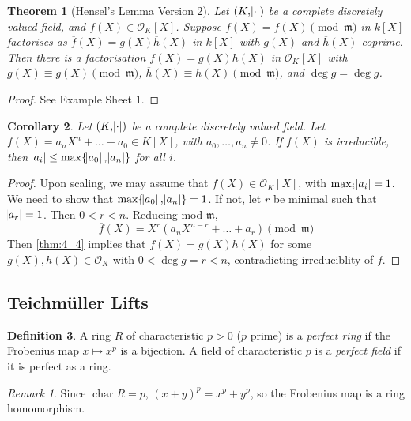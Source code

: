 \documentclass[11pt]{article}
\theoremstyle{definition}
\newtheorem{definition}{Definition}[subsection]
\theoremstyle{plain}
\newtheorem{theorem}[definition]{Theorem}
\newtheorem{corollary}[definition]{Corollary}
\theoremstyle{remark}
\newtheorem*{remark}{Remark}
\DeclareMathOperator{\Char}{char}
\newcommand{\cO}{\mathcal{O}}
\newcommand{\fm}{\mathfrak{m}}
\begin{document}
\begin{theorem}[Hensel's Lemma Version 2]\label{thm:4_4}
    Let $(K, \abs{\cdot})$ be a complete discretely valued field, and $f(X) \in \cO_K[X]$. Suppose $\overline{f}(X) = f(X) \pmod{\fm}$ in $k[X]$ factorises as $\overline{f}(X) = \overline{g}(X) \overline{h}(X)$ in $k[X]$ with $\overline{g}(X)$ and $\overline{h}(X)$ coprime. Then there is a factorisation $f(X) = g(X) h(X)$ in $\cO_K[X]$ with $\overline{g}(X) \equiv g(X) \pmod{\fm}$, $\overline{h}(X) \equiv h(X) \pmod{\fm}$, and $\deg{g} = \deg{\overline{g}}$.
\end{theorem}
\begin{proof}
    See Example Sheet 1.
\end{proof}

\begin{corollary}\label{cor:4_5}
    Let $(K, \abs{\cdot})$ be a complete discretely valued field. Let $f(X) = a_n X^n + \ldots + a_0 \in K[X]$, with $a_0, \ldots, a_n \neq 0$. If $f(X)$ is irreducible, then $\abs{a_i} \le \max\{\abs{a_0}, \abs{a_n}\}$ for all $i$.
\end{corollary}

\begin{proof}
    Upon scaling, we may assume that $f(X) \in \cO_K[X]$, with $\max_i \abs{a_i} = 1$. We need to show that $\max \{\abs{a_0}, \abs{a_n}\} = 1$. If not, let $r$ be minimal such that $\abs{a_r} = 1$. Then $0 < r < n$. Reducing mod $\fm$,
    \begin{equation*}
        \overline{f}(X) = X^r (a_n X^{n-r} + \ldots + a_r) \pmod{\fm}
    \end{equation*}
    Then \autoref{thm:4_4} implies that $f(X) = g(X) h(X)$ for some $g(X), h(X) \in \cO_K$ with $0 < \deg{g} = r < n$, contradicting irreduciblity of $f$.
\end{proof}

\subsection{Teichm\"uller Lifts}

\begin{definition}\label{def:5_1}
    A ring $R$ of characteristic $p > 0$ ($p$ prime) is a \emph{perfect ring} if the Frobenius map $x \mapsto x^p$ is a bijection. A field of characteristic $p$ is a \emph{perfect field} if it is perfect as a ring.
\end{definition}

\begin{remark}
    Since $\Char R = p$, $(x+y)^p = x^p + y^p$, so the Frobenius map is a ring homomorphism.
\end{remark}
\end{document}
